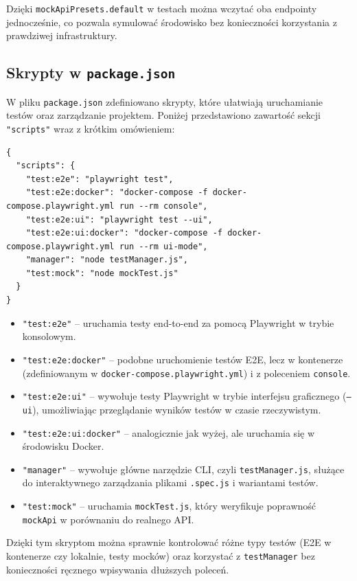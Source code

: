 \documentclass[12pt]{report}
\begin{document}
Dzięki \texttt{mockApiPresets.default} w testach można wczytać oba endpointy jednocześnie, co pozwala symulować środowisko bez konieczności korzystania z prawdziwej infrastruktury.


\subsection{Skrypty w \texttt{package.json}} %
\label{sec:skrypty-package}

W pliku \texttt{package.json} zdefiniowano skrypty, które ułatwiają uruchamianie testów oraz zarządzanie projektem. Poniżej przedstawiono zawartość sekcji \texttt{"scripts"} wraz z krótkim omówieniem:

\begin{verbatim}
{
  "scripts": {
    "test:e2e": "playwright test",
    "test:e2e:docker": "docker-compose -f docker-compose.playwright.yml run --rm console",
    "test:e2e:ui": "playwright test --ui",
    "test:e2e:ui:docker": "docker-compose -f docker-compose.playwright.yml run --rm ui-mode",
    "manager": "node testManager.js",
    "test:mock": "node mockTest.js"
  }
}
\end{verbatim}

\begin{itemize}
    \item \texttt{"test:e2e"} -- uruchamia testy end-to-end za pomocą Playwright w trybie konsolowym.  
    \item \texttt{"test:e2e:docker"} -- podobne uruchomienie testów E2E, lecz w kontenerze (zdefiniowanym w \texttt{docker-compose.playwright.yml}) i z poleceniem \texttt{console}.
    \item \texttt{"test:e2e:ui"} -- wywołuje testy Playwright w trybie interfejsu graficznego (\texttt{--ui}), umożliwiając przeglądanie wyników testów w czasie rzeczywistym.
    \item \texttt{"test:e2e:ui:docker"} -- analogicznie jak wyżej, ale uruchamia się w środowisku Docker.
    \item \texttt{"manager"} -- wywołuje główne narzędzie CLI, czyli \texttt{testManager.js}, służące do interaktywnego zarządzania plikami \texttt{.spec.js} i wariantami testów.
    \item \texttt{"test:mock"} -- uruchamia \texttt{mockTest.js}, który weryfikuje poprawność \texttt{mockApi} w porównaniu do realnego API.
\end{itemize}

Dzięki tym skryptom można sprawnie kontrolować różne typy testów (E2E w kontenerze czy lokalnie, testy mocków) oraz korzystać z \texttt{testManager} bez konieczności ręcznego wpisywania dłuższych poleceń.
\end{document}
